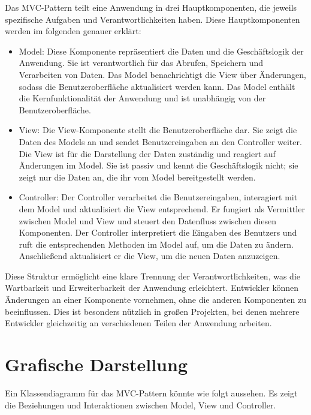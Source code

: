 Das \ac{MVC}-Pattern teilt eine Anwendung in drei Hauptkomponenten, die jeweils spezifische Aufgaben und Verantwortlichkeiten haben. Diese Hauptkomponenten werden im folgenden genauer erklärt:
\begin{itemize}

\item Model: Diese Komponente repräsentiert die Daten und die Geschäftslogik der Anwendung. Sie ist verantwortlich für das Abrufen, Speichern und Verarbeiten von Daten. Das Model benachrichtigt die View über Änderungen, sodass die Benutzeroberfläche aktualisiert werden kann. Das Model enthält die Kernfunktionalität der Anwendung und ist unabhängig von der Benutzeroberfläche.

\item View: Die View-Komponente stellt die Benutzeroberfläche dar. Sie zeigt die Daten des Models an und sendet Benutzereingaben an den Controller weiter. Die View ist für die Darstellung der Daten zuständig und reagiert auf Änderungen im Model. Sie ist passiv und kennt die Geschäftslogik nicht; sie zeigt nur die Daten an, die ihr vom Model bereitgestellt werden.
\newpage
\item Controller: Der Controller verarbeitet die Benutzereingaben, interagiert mit dem Model und aktualisiert die View entsprechend. Er fungiert als Vermittler zwischen Model und View und steuert den Datenfluss zwischen diesen Komponenten. Der Controller interpretiert die Eingaben des Benutzers und ruft die entsprechenden Methoden im Model auf, um die Daten zu ändern. Anschließend aktualisiert er die View, um die neuen Daten anzuzeigen.

\end{itemize}
Diese Struktur ermöglicht eine klare Trennung der Verantwortlichkeiten, was die Wartbarkeit und Erweiterbarkeit der Anwendung erleichtert. Entwickler können Änderungen an einer Komponente vornehmen, ohne die anderen Komponenten zu beeinflussen. Dies ist besonders nützlich in großen Projekten, bei denen mehrere Entwickler gleichzeitig an verschiedenen Teilen der Anwendung arbeiten.

\section{Grafische Darstellung}
\label{sec:klassendiagramm}

Ein Klassendiagramm für das \ac{MVC}-Pattern könnte wie folgt aussehen. Es zeigt die Beziehungen und Interaktionen zwischen Model, View und Controller.

